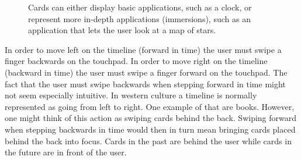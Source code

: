 	\begin{figure}[ht!]
		\centering
  	 \qquad
   	\qquad
   	\qquad
		\caption{Cards can either display basic applications, such as a clock, or represent more in-depth applications (immersions), such as an application that lets the user look at a map of stars.}
		\label{GoogleGlassCards}
	\end{figure}

In order to move left on the timeline (forward in time) the user must swipe a finger backwards on the touchpad. In order to move right on the timeline (backward in time) the user must swipe a finger forward on the touchpad. The fact that the user must swipe backwards when stepping forward in time might not seem especially intuitive. In western culture a timeline is normally represented as going from left to right. One example of that are books. However, one might think of this action as swiping cards behind the back. Swiping forward when stepping backwards in time would then in turn mean bringing cards placed behind the back into focus. Cards in the past are behind the user while cards in the future are in front of the user.\\

